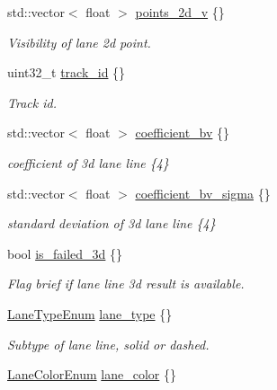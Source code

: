 \begin{DoxyCompactItemize}
std\+::vector$<$ float $>$ \hyperlink{structmaf__perception__interface_1_1Lane_af3e23cd34e5ac715c7a8a6dc7250dfb0}{points\+\_\+2d\+\_\+v} \{\}
\begin{DoxyCompactList}\small\item\em Visibility of lane 2d point. \end{DoxyCompactList}\item 
uint32\+\_\+t \hyperlink{structmaf__perception__interface_1_1Lane_ad4ac2be70c890dad07faa93111788092}{track\+\_\+id} \{\}
\begin{DoxyCompactList}\small\item\em Track id. \end{DoxyCompactList}\item 
std\+::vector$<$ float $>$ \hyperlink{structmaf__perception__interface_1_1Lane_a3a4ba2802c5d4f3d100984fe5a9d94d7}{coefficient\+\_\+bv} \{\}
\begin{DoxyCompactList}\small\item\em coefficient of 3d lane line \{4\} \end{DoxyCompactList}\item 
std\+::vector$<$ float $>$ \hyperlink{structmaf__perception__interface_1_1Lane_a33d3cfd9a6b6d57080c4c05ec29d87c3}{coefficient\+\_\+bv\+\_\+sigma} \{\}
\begin{DoxyCompactList}\small\item\em standard deviation of 3d lane line \{4\} \end{DoxyCompactList}\item 
bool \hyperlink{structmaf__perception__interface_1_1Lane_a0eb7529c358035a33a6cdf74ee9b2fc6}{is\+\_\+failed\+\_\+3d} \{\}
\begin{DoxyCompactList}\small\item\em Flag brief if lane line 3d result is available. \end{DoxyCompactList}\item 
\hyperlink{structmaf__perception__interface_1_1LaneTypeEnum}{Lane\+Type\+Enum} \hyperlink{structmaf__perception__interface_1_1Lane_a103d2ce3dc01738040f457072db00f55}{lane\+\_\+type} \{\}
\begin{DoxyCompactList}\small\item\em Subtype of lane line, solid or dashed. \end{DoxyCompactList}\item 
\hyperlink{structmaf__perception__interface_1_1LaneColorEnum}{Lane\+Color\+Enum} \hyperlink{structmaf__perception__interface_1_1Lane_a1ae174a0aa6f7bb6c6480f085341ad47}{lane\+\_\+color} \{\}

\end{DoxyCompactItemize}
